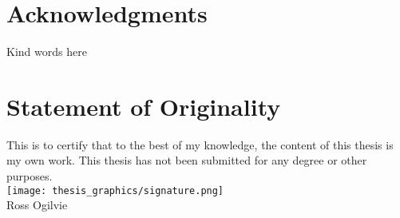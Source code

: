 
\section*{Acknowledgments}

Kind words here

\vfill
\section*{Statement of Originality}

This is to certify that to the best of my knowledge, the content of this thesis is my own work. This thesis has not been submitted for any degree or other purposes.
\\
\texttt{[image: thesis\_graphics/signature.png]}
\\
Ross Ogilvie
